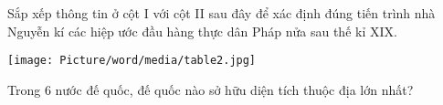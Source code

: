 \documentclass[preview,border=1pt]{standalone}
\begin{document}
	Sắp xếp thông tin ở cột I với cột II sau đây để xác định đúng tiến trình nhà Nguyễn kí các hiệp ước đầu hàng thực dân Pháp nửa sau thế kỉ XIX.\\
\begin{center}
	\texttt{[image: Picture/word/media/table2.jpg]}
\end{center}
Trong 6 nước đế quốc, đế quốc nào sở hữu diện tích thuộc địa lớn nhất?\\
\end{document}
